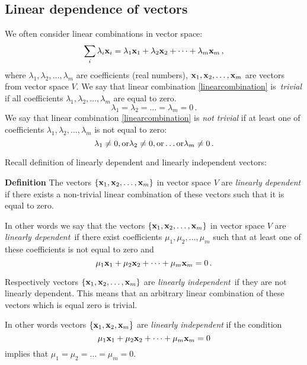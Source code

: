 \documentclass[12pt]{article}
\numberwithin{equation}{section}
\begin{document}
\subsection{Linear dependence of vectors}



We often consider linear combinations  in vector space:
           \begin{equation}\label{linearcombination}
            \sum_i\lambda_i{\bf x}_i=\lambda_1{\bf x}_1+\lambda_2{\bf x}_2+\dots+\lambda_m{\bf x}_m\,,
           \end{equation}
          where $\lambda_1,\lambda_2,\dots,\lambda_m$ are coefficients (real numbers),
          ${\bf x}_1,{\bf x}_2,\dots,{\bf x}_m$ are vectors from vector space $V$.
We say that linear combination \eqref{linearcombination} is {\it \,trivial\,} if all coefficients $\lambda_1,\lambda_2,\dots,\lambda_m$ are equal to zero.
              $$
               \lambda_1=\lambda_2=\dots=\lambda_m=0\,.
               $$
We say that linear combination \eqref{linearcombination} is {\it not trivial} if at least one of  coefficients $\lambda_1,\lambda_2,\dots,\lambda_m$ is not equal to zero:
                    $$
         \lambda_1\not=0, {\rm or}\lambda_2\not=0,{\rm or}\dots {\rm or} \lambda_m\not=0\,.
                    $$

Recall definition of linearly dependent and linearly independent vectors:

{\bf Definition} The vectors $\{{\bf x}_1,{\bf x}_2,\dots,{\bf x}_m\}$ in vector space $V$ are {\it linearly dependent\,}
if there exists a non-trivial linear combination of these vectors such that it is equal to zero.

In other words we say that the vectors $\{{\bf x}_1,{\bf x}_2,\dots,{\bf x}_m\}$ in vector space $V$ are {\it linearly dependent\,} if there exist
coefficients $\mu_1,\mu_2,\dots,\mu_m$ such that at least one of these coefficients is not equal to zero and
               \begin{equation}\label{defoflindepend}
             \mu_1{\bf x}_1+\mu_2{\bf x}_2+\dots+\mu_m{\bf x}_m=0\,.
                 \end{equation}

Respectively  vectors $\{{\bf x}_1,{\bf x}_2,\dots,{\bf x}_m\}$ are {\it linearly independent\,} if they are not linearly dependent.
  This means that an arbitrary linear combination of these vectors which is equal  zero is trivial.

In other words
vectors $\{{\bf x}_1,{\bf x}_2,{\bf x}_m\}$ are {\it linearly independent} if the condition
                      $$
                      \mu_1{\bf x}_1+\mu_2{\bf x}_2+\dots+\mu_m{\bf x}_m=0
                      $$
implies that $\mu_1=\mu_2=\dots=\mu_m=0$.
\end{document}
